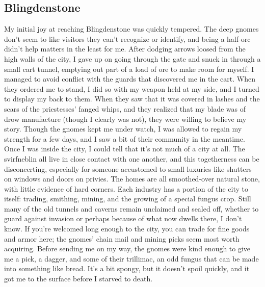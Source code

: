 \documentclass[10pt,a4paper,twoside,twocolumn,openany,bg=print,nodeprecatedcode]{dndbook}
\begin{document}
\subsection{Blingdenstone}
My initial joy at reaching Blingdenstone was quickly tempered. The deep gnomes don't seem to like visitors they can't recognize or identify, and being a half-orc didn't help matters in the least for me. After dodging arrows loosed from the high walls of the city, I gave up on going through the gate and snuck in through a small cart tunnel, emptying out part of a load of ore to make room for myself.
I managed to avoid conflict with the guards that discovered me in the cart. When they ordered me to stand, I did so with my weapon held at my side, and I turned to display my back to them. When they saw that it was covered in lashes and the scars of the priestesses' fanged whips, and they realized that my blade was of drow manufacture (though I clearly was not), they were willing to believe my story.
Though the gnomes kept me under watch, I was allowed to regain my strength for a few days, and I saw a bit of their community in the meantime. Once I was inside the city, I could tell that it's not much of a city at all. The svirfneblin all live in close contact with one another, and this togetherness can be disconcerting, especially for someone accustomed to small luxuries like shutters on windows and doors on privies. The homes are all smoothed-over natural stone, with little evidence of hard corners.
Each industry has a portion of the city to itself: trading, smithing, mining, and the growing of a special fungus crop. Still many of the old tunnels and caverns remain unclaimed and sealed off, whether to guard against invasion or perhaps because of what now dwells there, I don't know.
If you're welcomed long enough to the city, you can trade for fine goods and armor here; the gnomes' chain mail and mining picks seem most worth acquiring. Before sending me on my way, the gnomes were kind enough to give me a pick, a dagger, and some of their trillimac, an odd fungus that can be made into something like bread. It's a bit spongy, but it doesn't spoil quickly, and it got me to the surface before I starved to death.
\end{document}
